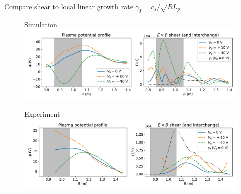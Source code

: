 \documentclass[12pt,table]{beamer}
\begin{document}
\begin{frame}{Compare shear to local linear growth rate \small $\gamma_I = c_s/\sqrt{RL_p}$}
\vspace{-.5cm}
    \begin{figure}
        \centering
        Simulation
        \includegraphics[width=.9\textwidth]{figs/phi-gamma-sim.pdf}
        \label{fig:my_label}
    \end{figure}
    \vspace{-.75cm}
    \begin{figure}
        \centering
        Experiment
        \includegraphics[width=.9\textwidth]{figs/phi-gamma-exp.pdf}
        \label{fig:my_label}
    \end{figure}
\end{frame}
\end{document}
